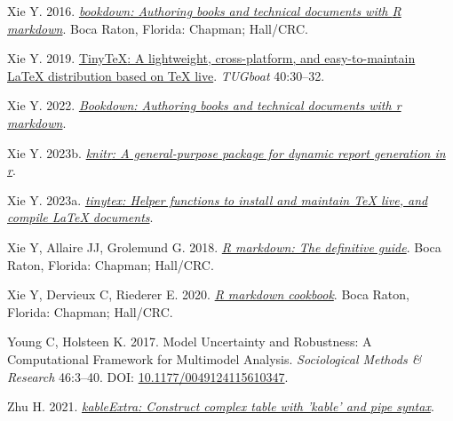 \documentclass[10pt,a4paper]{article}
\newlength{\cslhangindent}
\newenvironment{CSLReferences}[2] %
 {\begin{list}{}{%
  \setlength{\itemindent}{0pt}
  \setlength{\leftmargin}{0pt}
  \setlength{\parsep}{0pt}
  \ifodd #1
   \setlength{\leftmargin}{\cslhangindent}
   \setlength{\itemindent}{-1\cslhangindent}
  \fi
  \setlength{\itemsep}{#2\baselineskip}}}
 {\end{list}}
\begin{document}
\begin{CSLReferences}{1}{0}
Xie Y. 2016. \emph{\href{https://bookdown.org/yihui/bookdown}{{bookdown}: Authoring books and technical documents with {R} markdown}}. Boca Raton, Florida: Chapman; Hall/CRC.

Xie Y. 2019. \href{https://tug.org/TUGboat/Contents/contents40-1.html}{{TinyTeX}: A lightweight, cross-platform, and easy-to-maintain LaTeX distribution based on TeX live}. \emph{TUGboat} 40:30--32.

Xie Y. 2022. \emph{\href{https://CRAN.R-project.org/package=bookdown}{Bookdown: Authoring books and technical documents with r markdown}}.

Xie Y. 2023b. \emph{\href{https://yihui.org/knitr/}{{knitr}: A general-purpose package for dynamic report generation in r}}.

Xie Y. 2023a. \emph{\href{https://github.com/rstudio/tinytex}{{tinytex}: Helper functions to install and maintain TeX live, and compile LaTeX documents}}.

Xie Y, Allaire JJ, Grolemund G. 2018. \emph{\href{https://bookdown.org/yihui/rmarkdown}{R markdown: The definitive guide}}. Boca Raton, Florida: Chapman; Hall/CRC.

Xie Y, Dervieux C, Riederer E. 2020. \emph{\href{https://bookdown.org/yihui/rmarkdown-cookbook}{R markdown cookbook}}. Boca Raton, Florida: Chapman; Hall/CRC.

Young C, Holsteen K. 2017. Model {Uncertainty} and {Robustness}: {A} {Computational} {Framework} for {Multimodel} {Analysis}. \emph{Sociological Methods \& Research} 46:3--40. DOI: \href{https://doi.org/10.1177/0049124115610347}{10.1177/0049124115610347}.

Zhu H. 2021. \emph{\href{https://CRAN.R-project.org/package=kableExtra}{kableExtra: Construct complex table with 'kable' and pipe syntax}}.

\end{CSLReferences}
\end{document}
